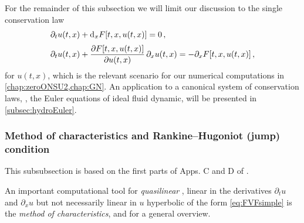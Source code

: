 For the remainder of this subsection we will limit our discussion to the single conservation law
\begin{align}
	&\partial_t u ( t, x )+\difx\! F[ t,x,u ( t, x )]=0\,,\\[.2em]
	&\partial_t u ( t, x )+\frac{\partial F[ t,x,u ( t, x )]}{\partial u(t,x)}\,\partial_x u ( t, x ) = -\partial_x F[ t,x,u ( t, x )]\, ,\label{eq:FVFsimple}
\end{align}
for $u(t,x)$, which is the relevant scenario for our numerical computations in \cref{chap:zeroONSU2,chap:GN}. 
An application to a canonical system of conservation laws, \ie{}, the Euler equations of ideal fluid dynamic, will be presented in \cref{subsec:hydroEuler}.

\subsubsection{Method of characteristics and Rankine–Hugoniot (jump) condition}\label{subsec:MoC}
\begin{disclaimer}
	This subsubsection is based on the first parts of Apps. C and D of .
\end{disclaimer}
An important computational tool for \textit{quasilinear} \dash{} \ie{}, linear in the derivatives $\partial_t u$ and $\partial_x u$ but not necessarily linear in $u$ \dash{} hyperbolic \pdes{} of the form \eqref{eq:FVFsimple} is the \textit{method of characteristics}, \cf{}  and  for a general overview.

